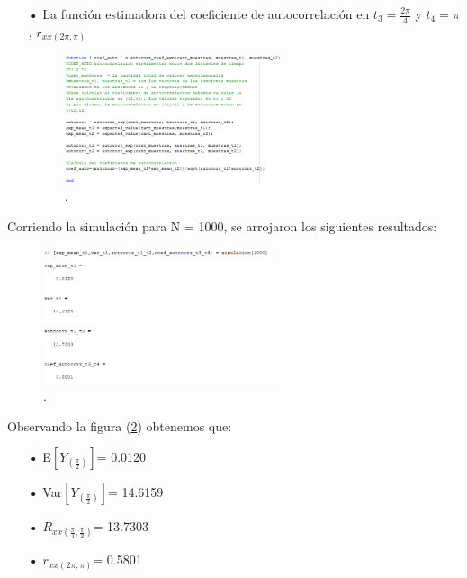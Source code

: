 \begin{enumerate}
\item[•] La función estimadora del coeficiente de autocorrelación en $t_3 = \frac{2\pi}{4}$ y $t_4 = \pi$, $r_{xx(2\pi,\pi)}$
\begin{figure}[H]
\centering
	\includegraphics[width=0.6\textwidth, trim = {0 0 0 0},clip]{./ImagenesEjercicio1/coefauto.png}
	\caption{.}
	\label{fig:coefauto}
\end{figure}
\end{enumerate}

Corriendo la simulación para N = 1000, se arrojaron los siguientes resultados:
\begin{figure}[H]
\centering
	\includegraphics[width=0.6\textwidth, trim = {0 0 0 0},clip]{./ImagenesEjercicio1/result.png}
	\caption{.}
	\label{fig:result}
\end{figure}

Observando la figura (\ref{fig:result}) obtenemos que:
\begin{enumerate}
	\item[•]E$\left[ Y_{(\frac{\pi}{2})}\right]$= 0.0120 
	\item[•]Var$\left[Y_{(\frac{\pi}{2})}\right]$= 14.6159
	\item[•]$R_{xx(\frac{\pi}{4},\frac{\pi}{2})}$= 13.7303
	\item[•]$r_{xx(2\pi,\pi)}$= 0.5801
\end{enumerate}

